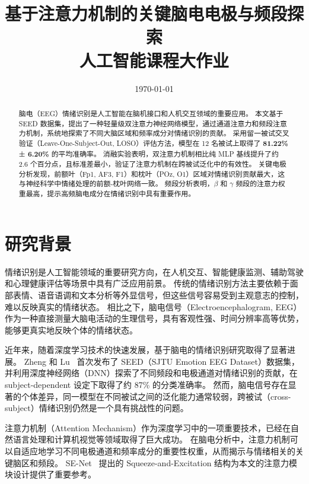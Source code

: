 \documentclass[12pt,a4paper]{ctexart}
\title{
    \vspace{-2cm}
    {\Large \textbf{基于注意力机制的关键脑电电极与频段探索}}\\[4pt]
    {\normalsize 人工智能课程大作业}
}
\author{
}
\date{\today}
\begin{document}
\maketitle
\thispagestyle{empty}

\begin{abstract}
\noindent
脑电（EEG）情绪识别是人工智能在脑机接口和人机交互领域的重要应用。
本文基于 SEED 数据集，提出了一种轻量级双注意力神经网络模型，通过通道注意力和频段注意力机制，系统地探索了不同大脑区域和频率成分对情绪识别的贡献。
采用留一被试交叉验证（Leave-One-Subject-Out, LOSO）评估方法，模型在 12 名被试上取得了 \textbf{81.22\% ± 6.20\%} 的平均准确率。
消融实验表明，双注意力机制相比纯 MLP 基线提升了约 2.6 个百分点，且标准差最小，验证了注意力机制在跨被试泛化中的有效性。
关键电极分析发现，前额叶（Fp1, AF3, F1）和枕叶（POz, O1）区域对情绪识别贡献最大，这与神经科学中情绪处理的前额-枕叶网络一致。
频段分析表明，$\beta$ 和 $\gamma$ 频段的注意力权重最高，提示高频脑电成分在情绪识别中具有重要作用。
\end{abstract}

\section{研究背景}

情绪识别是人工智能领域的重要研究方向，在人机交互、智能健康监测、辅助驾驶和心理健康评估等场景中具有广泛应用前景。
传统的情绪识别方法主要依赖于面部表情、语音语调和文本分析等外显信号，但这些信号容易受到主观意志的控制，难以反映真实的情绪状态。
相比之下，脑电信号（Electroencephalogram, EEG）作为一种直接测量大脑电活动的生理信号，具有客观性强、时间分辨率高等优势，能够更真实地反映个体的情绪状态。

近年来，随着深度学习技术的快速发展，基于脑电的情绪识别研究取得了显著进展。
Zheng 和 Lu~\cite{zheng2015} 首次发布了 SEED（SJTU Emotion EEG Dataset）数据集，并利用深度神经网络（DNN）探索了不同频段和电极通道对情绪识别的贡献，在 subject-dependent 设定下取得了约 87\% 的分类准确率。
然而，脑电信号存在显著的个体差异，同一模型在不同被试之间的泛化能力通常较弱，跨被试（cross-subject）情绪识别仍然是一个具有挑战性的问题。

注意力机制（Attention Mechanism）作为深度学习中的一项重要技术，已经在自然语言处理和计算机视觉等领域取得了巨大成功。
在脑电分析中，注意力机制可以自适应地学习不同电极通道和频率成分的重要性权重，从而揭示与情绪相关的关键脑区和频段。
SE-Net~\cite{senet} 提出的 Squeeze-and-Excitation 结构为本文的注意力模块设计提供了重要参考。
\end{document}
